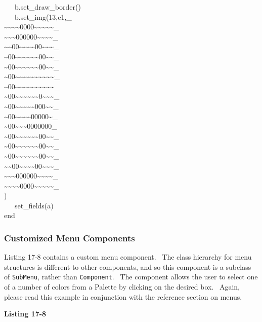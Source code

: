 {\>   \ \ \ b.set\_draw\_border() \\
\>   \ \ \ b.set\_img({\textquotedbl}13,c1,\_ \\
\~{}\~{}\~{}\~{}0000\~{}\~{}\~{}\~{}\~{}\_ \\
\~{}\~{}\~{}000000\~{}\~{}\~{}\~{}\_ \\
\~{}\~{}00\~{}\~{}\~{}\~{}00\~{}\~{}\~{}\_ \\
\~{}00\~{}\~{}\~{}\~{}\~{}\~{}00\~{}\~{}\_ \\
\~{}00\~{}\~{}\~{}\~{}\~{}\~{}00\~{}\~{}\_ \\
\~{}00\~{}\~{}\~{}\~{}\~{}\~{}\~{}\~{}\~{}\~{}\_ \\
\~{}00\~{}\~{}\~{}\~{}\~{}\~{}\~{}\~{}\~{}\~{}\_ \\
\~{}00\~{}\~{}\~{}\~{}\~{}\~{}0\~{}\~{}\~{}\_ \\
\~{}00\~{}\~{}\~{}\~{}\~{}000\~{}\~{}\_ \\
\~{}00\~{}\~{}\~{}\~{}00000\~{}\_ \\
\~{}00\~{}\~{}\~{}0000000\_ \\
\~{}00\~{}\~{}\~{}\~{}\~{}\~{}00\~{}\~{}\_ \\
\~{}00\~{}\~{}\~{}\~{}\~{}\~{}00\~{}\~{}\_ \\
\~{}00\~{}\~{}\~{}\~{}\~{}\~{}00\~{}\~{}\_ \\
\~{}\~{}00\~{}\~{}\~{}\~{}00\~{}\~{}\~{}\_ \\
\~{}\~{}\~{}000000\~{}\~{}\~{}\~{}\_ \\
\~{}\~{}\~{}\~{}0000\~{}\~{}\~{}\~{}\~{}\_ \\
{\textquotedbl}) \\
\>   \ \ \ set\_fields(a) \\
end
}

\subsubsection{Customized Menu Components}

Listing 17-8 contains a custom menu component. \ The class hierarchy for
menu structures is different to other components, and so this component
is a subclass of \texttt{SubMenu}, rather than
\texttt{Component}. \ The component allows the user to select one of a
number of colors from a Palette by clicking on the desired box.
\ Again, please read this example in conjunction with the reference
section on menus.

\bigskip

{\sffamily\bfseries
Listing 17-8}

